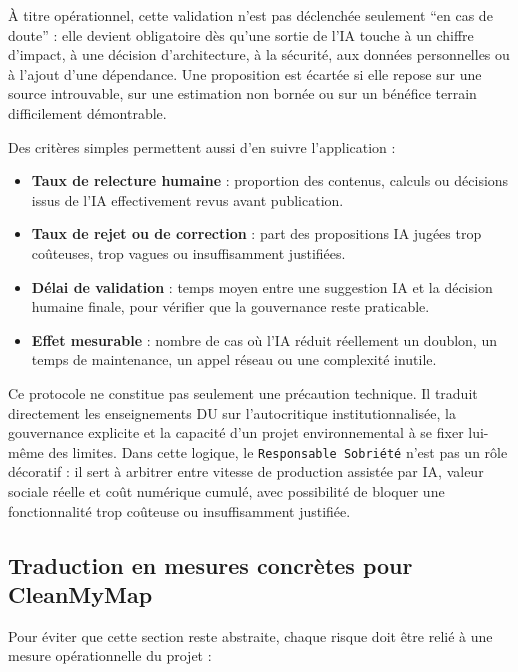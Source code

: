 \documentclass[
  10pt,
  a4paper,
  DIV=11,
  numbers=noendperiod,
  oneside]{scrreprt}
\providecommand{\tightlist}{%
  \setlength{\itemsep}{0pt}\setlength{\parskip}{0pt}}
\let\oldtextbf\textbf
\renewcommand{\textbf}[1]{\oldtextbf{\textcolor{cmmnavy}{#1}}}
\begin{document}
À titre opérationnel, cette validation n'est pas déclenchée seulement
``en cas de doute'' : elle devient obligatoire dès qu'une sortie de l'IA
touche à un chiffre d'impact, à une décision d'architecture, à la
sécurité, aux données personnelles ou à l'ajout d'une dépendance. Une
proposition est écartée si elle repose sur une source introuvable, sur
une estimation non bornée ou sur un bénéfice terrain difficilement
démontrable.

Des critères simples permettent aussi d'en suivre l'application :

\begin{itemize}
\tightlist
\item
  \textbf{Taux de relecture humaine} : proportion des contenus, calculs
  ou décisions issus de l'IA effectivement revus avant publication.
\item
  \textbf{Taux de rejet ou de correction} : part des propositions IA
  jugées trop coûteuses, trop vagues ou insuffisamment justifiées.
\item
  \textbf{Délai de validation} : temps moyen entre une suggestion IA et
  la décision humaine finale, pour vérifier que la gouvernance reste
  praticable.
\item
  \textbf{Effet mesurable} : nombre de cas où l'IA réduit réellement un
  doublon, un temps de maintenance, un appel réseau ou une complexité
  inutile.
\end{itemize}

Ce protocole ne constitue pas seulement une précaution technique. Il
traduit directement les enseignements DU sur l'autocritique
institutionnalisée, la gouvernance explicite et la capacité d'un projet
environnemental à se fixer lui-même des limites. Dans cette logique, le
\texttt{Responsable\ Sobriété} n'est pas un rôle décoratif : il sert à
arbitrer entre vitesse de production assistée par IA, valeur sociale
réelle et coût numérique cumulé, avec possibilité de bloquer une
fonctionnalité trop coûteuse ou insuffisamment justifiée.

\subsection{Traduction en mesures concrètes pour
CleanMyMap}\label{traduction-en-mesures-concruxe8tes-pour-cleanmymap}

Pour éviter que cette section reste abstraite, chaque risque doit être
relié à une mesure opérationnelle du projet :
\end{document}
